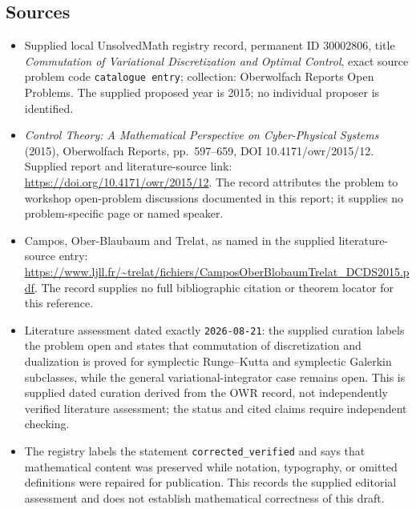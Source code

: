 \documentclass[11pt]{article}
\begin{document}
\subsection{Sources}
\begin{itemize}
\item Supplied local UnsolvedMath registry record, permanent ID \(30002806\), title \emph{Commutation of Variational Discretization and Optimal Control}, exact source problem code \texttt{catalogue entry}; collection: Oberwolfach Reports Open Problems. The supplied proposed year is 2015; no individual proposer is identified.
\item \emph{Control Theory: A Mathematical Perspective on Cyber-Physical Systems} (2015), Oberwolfach Reports, pp.\ 597--659, DOI 10.4171/owr/2015/12. Supplied report and literature-source link: \url{https://doi.org/10.4171/owr/2015/12}. The record attributes the problem to workshop open-problem discussions documented in this report; it supplies no problem-specific page or named speaker.
\item Campos, Ober-Blaubaum and Trelat, as named in the supplied literature-source entry: \url{https://www.ljll.fr/~trelat/fichiers/CamposOberBlobaumTrelat_DCDS2015.pdf}. The record supplies no full bibliographic citation or theorem locator for this reference.
\item Literature assessment dated exactly \texttt{2026-08-21}: the supplied curation labels the problem open and states that commutation of discretization and dualization is proved for symplectic Runge--Kutta and symplectic Galerkin subclasses, while the general variational-integrator case remains open. This is supplied dated curation derived from the OWR record, not independently verified literature assessment; the status and cited claims require independent checking.
\item The registry labels the statement \texttt{corrected\_verified} and says that mathematical content was preserved while notation, typography, or omitted definitions were repaired for publication. This records the supplied editorial assessment and does not establish mathematical correctness of this draft.
\end{itemize}
\end{document}
